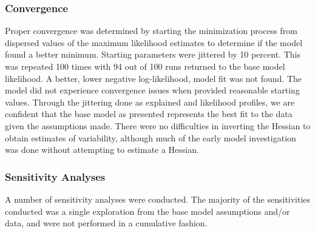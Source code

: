 \documentclass[11pt,
  english,
  a4paper,
]{article}
\begin{document}
\leavevmode\tagmcend\tagstructend


\hypertarget{convergence}{%
\subsubsection{Convergence}\label{convergence}}

\leavevmode\tagmcend\tagstructend


Proper convergence was determined by starting the minimization process from dispersed values of the maximum likelihood estimates to determine if the model found a better minimum. Starting parameters were jittered by 10 percent. This was repeated 100 times with 94 out of 100 runs returned to the base model likelihood. A better, lower negative log-likelihood, model fit was not found. The model did not experience convergence issues when provided reasonable starting values. Through the jittering done as explained and likelihood profiles, we are confident that the base model as presented represents the best fit to the data given the assumptions made. There were no difficulties in inverting the Hessian to obtain estimates of variability, although much of the early model investigation was done without attempting to estimate a Hessian.

\leavevmode\tagmcend\tagstructend\par


\hypertarget{sens}{%
\subsubsection{Sensitivity Analyses}\label{sens}}

\leavevmode\tagmcend\tagstructend


A number of sensitivity analyses were conducted. The majority of the sensitivities conducted was a single exploration from the base model assumptions and/or data, and were not performed in a cumulative fashion.

\leavevmode\tagmcend\tagstructend\par
\end{document}
